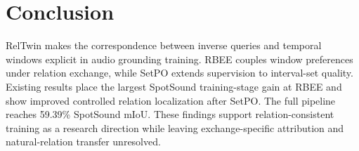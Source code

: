 \section{Conclusion}
RelTwin makes the correspondence between inverse queries and temporal windows explicit in audio grounding training. RBEE couples window preferences under relation exchange, while SetPO extends supervision to interval-set quality. Existing results place the largest SpotSound training-stage gain at RBEE and show improved controlled relation localization after SetPO. The full pipeline reaches 59.39\% SpotSound mIoU. These findings support relation-consistent training as a research direction while leaving exchange-specific attribution and natural-relation transfer unresolved.
